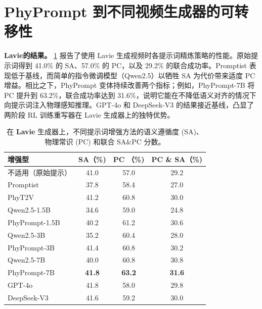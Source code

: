 \section{PhyPrompt 到不同视频生成器的可转移性}
\textbf{Lavie的结果。}
\cref{tab:enhanced_models} 报告了使用 Lavie 生成视频时各提示词精炼策略的性能。原始提示词得到 41.0\% 的 SA、57.0\% 的 PC，以及 29.2\% 的联合成功率。Promptist 表现低于基线，而简单的指令微调模型（Qwen2.5）以牺牲 SA 为代价带来适度 PC 增益。相比之下，PhyPrompt 变体持续改善两个指标；例如，PhyPrompt-7B 将 PC 提升到 63.2\%，联合成功率达到 31.6\%，说明它能在不降低语义对齐的情况下向提示词注入物理感知推理。GPT-4o 和 DeepSeek-V3 的结果接近基线，凸显了两阶段 RL 训练重写器在 Lavie 生成器上的独特优势。
\begin{table}[ht]
  \centering
\caption{在 \textbf{Lavie} 生成器上，不同提示词增强方法的语义遵循度 (SA)、物理常识 (PC) 和联合 SA\&PC 分数。}
  \label{tab:enhanced_models}
  \setlength{\tabcolsep}{3pt}
  \begin{tabular}{lccc}
    \toprule
    \textbf{增强型} & \textbf{SA（\%)} & \textbf{PC （\%)} & \textbf{PC \& SA（\%)} \\
    \midrule
    不适用（原始提示） & 41.0 & 57.0 & 29.2 \\
    Promptist             & 37.8 & 58.4 & 27.0 \\
    PhyT2V                & 41.2 & 60.8 & 30.0 \\
    \midrule
    Qwen2.5-1.5B          & 34.6 & 59.0 & 24.8 \\
    PhyPrompt-1.5B        & 40.2 & 61.2 & 30.6 \\
    Qwen2.5-3B            & 35.2 & 60.4 & 28.0 \\
    PhyPrompt-3B          & 41.4 & 60.8 & 30.2 \\
    Qwen2.5-7B            & 40.0 & 60.8 & 30.8 \\
    PhyPrompt-7B          & \textbf{41.8} & \textbf{63.2} & \textbf{31.6}\\
    \midrule
    GPT-4o                & 41.8 & 58.0 & 29.8 \\
    DeepSeek-V3           & 41.6 & 59.2 & 30.0 \\
    \bottomrule
  \end{tabular}
\end{table}

